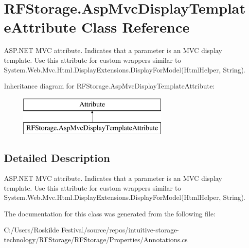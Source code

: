\section{R\+F\+Storage.\+Asp\+Mvc\+Display\+Template\+Attribute Class Reference}
\label{class_r_f_storage_1_1_asp_mvc_display_template_attribute}


A\+S\+P.\+N\+ET M\+VC attribute. Indicates that a parameter is an M\+VC display template. Use this attribute for custom wrappers similar to {\ttfamily System.\+Web.\+Mvc.\+Html.\+Display\+Extensions.\+Display\+For\+Model(\+Html\+Helper, String)}.  


Inheritance diagram for R\+F\+Storage.\+Asp\+Mvc\+Display\+Template\+Attribute\+:\begin{figure}[H]
\begin{center}
\leavevmode
\includegraphics[height=2.000000cm]{class_r_f_storage_1_1_asp_mvc_display_template_attribute}
\end{center}
\end{figure}


\subsection{Detailed Description}
A\+S\+P.\+N\+ET M\+VC attribute. Indicates that a parameter is an M\+VC display template. Use this attribute for custom wrappers similar to {\ttfamily System.\+Web.\+Mvc.\+Html.\+Display\+Extensions.\+Display\+For\+Model(\+Html\+Helper, String)}. 



The documentation for this class was generated from the following file\+:\begin{DoxyCompactItemize}
\item 
C\+:/\+Users/\+Roskilde Festival/source/repos/intuitive-\/storage-\/technology/\+R\+F\+Storage/\+R\+F\+Storage/\+Properties/Annotations.\+cs\end{DoxyCompactItemize}
